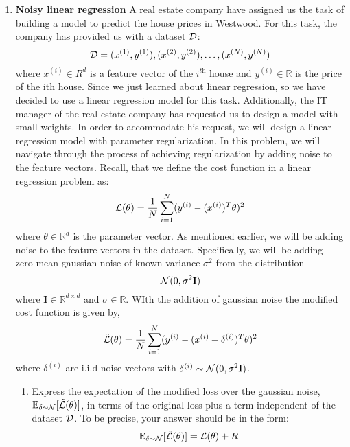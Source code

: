 \documentclass{article}
\newcommand{\R}{\mathbb{R}}
\renewcommand{\it}[1]{\textit{{#1}}}
\renewcommand{\bf}[1]{\textbf{{#1}}}
\begin{document}
    \begin{enumerate}
        \item \bf{Noisy linear regression} \vspace{11pt}
            A real estate company have assigned us the task of building a model to predict the house
            prices in Westwood. For this task, the company has provided us with a dataset $\cal{D}$:
            \[{\cal{D}} = {(x^{(1)}, y^{(1)}), (x^{(2)}, y^{(2)}), \ldots, (x^{(N)}, y^{(N)})}\]
            where $x^{(i)} \in R^d$ is a feature vector of the $i^{\it{th}}$ house and $y^{(i)} \in \R$ 
            is the price of the ith house. Since we just learned about linear regression, so we have 
            decided to use a linear regression model for this task. Additionally, the IT manager of 
            the real estate company has requested us to design a model with small weights. In order 
            to accommodate his request, we will design a linear regression model with parameter 
            regularization. In this problem, we will navigate through the process of achieving 
            regularization by adding noise to the feature vectors. Recall, that we define the cost 
            function in a linear regression problem as:
            \[{\cal{L}} (\theta) = \frac{1}{N} \sum^{N}_{i = 1} (y^{(i)} - (x^{(i)})^T \theta)^2\]
            where $\theta \in \R^d$ is the parameter vector. As mentioned earlier, we will be adding 
            noise to the feature vectors in the dataset. Specifically, we will be adding zero-mean 
            gaussian noise of known variance $\sigma^2$ from the distribution
            \[{\cal{N}} (0, \sigma^2 \bf{I})\]
            where $\bf{I} \in \R^{d \times d}$ and $\sigma \in \R$. WIth the addition of gaussian
            noise the modified cost function is given by,
            \[{\tilde{\cal{L}}} (\theta) = \frac{1}{N}\sum^{N}_{i = 1} (y^{(i)} - (x^{(i)} + \delta^{(i)})^T \theta)^2\]
            where $\delta^{(i)}$ are i.i.d noise vectors with $\delta^{(i)} \sim {\cal{N}} (0, \sigma^2 \bf{I})$.
            \begin{enumerate}
                \item Express the expectation of the modified loss over the gaussian noise, 
                    $\mathbb{E}_{\delta \sim {\cal{N}}} [\tilde{{\cal{L}}} (\theta)]$, in terms of
                    the original loss plus a term independent of the dataset $\cal{D}$. To be precise, 
                    your answer should be in the form:
                    \[\mathbb{E}_{\delta \sim {\cal{N}}} [\tilde{{\cal{L}}} (\theta)] = {\cal{L}} (\theta) + R\]

\end{enumerate}
\end{enumerate}
\end{document}
